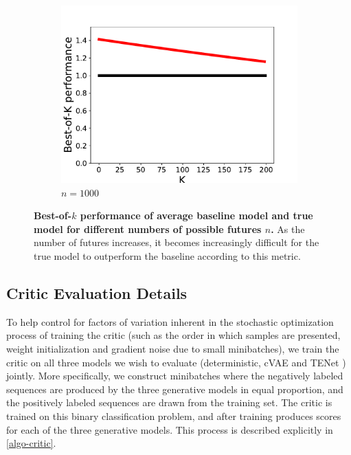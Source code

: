 \documentclass{article}
\newcommand{\modelname}{TENet }
\begin{document}
\begin{appendices}
\begin{figure}
    \begin{subfigure}[b]{0.3\textwidth}
      \includegraphics[width=\textwidth]{images/best_of_k_toy_n1000.pdf}
      \caption{$n=1000$}
      \label{fig:mouse}
    \end{subfigure}
    \caption{
      \textbf{Best-of-$k$ performance of average baseline model and true model for different numbers of possible futures $n$.}
      As the number of futures increases, it becomes increasingly difficult for the true model to outperform the baseline according to this metric.}
    \label{expected-loss}
  \end{figure}

  \subsection{Critic Evaluation Details}
  \label{critic-details}

  To help control for factors of variation inherent in the stochastic optimization process of training the critic (such as the order in which samples are presented, weight initialization and gradient noise due to small minibatches), we train the critic on all three models we wish to evaluate (deterministic, cVAE and \modelname) jointly.
  More specifically, we construct minibatches where the negatively labeled sequences are produced by the three generative models in equal proportion, and the positively labeled sequences are drawn from the training set.
  The critic is trained on this binary classification problem, and after training produces scores for each of the three generative models.
  This process is described explicitly in \cref{algo-critic}.


\end{appendices}
\end{document}
